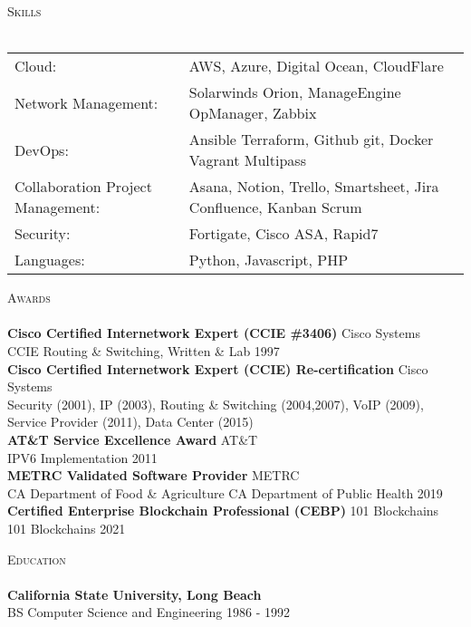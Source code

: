 \documentclass[a4paper]{article}
\newcommand{\lineunder} {
    \vspace*{-8pt} \\
    \hspace*{-18pt} \hrulefill \\
}
\newcommand{\header} [1] {
    {\hspace*{-18pt}\vspace*{6pt} \textsc{#1}}
    \vspace*{-6pt} \lineunder
}
\begin{document}
\header{Skills}
\begin{tabular}{ l l }
	Cloud:                                       & AWS, Azure, Digital Ocean, CloudFlare                                                               \\
	Network Management:                          & Solarwinds Orion, ManageEngine OpManager, Zabbix                                                    \\
	DevOps:                                      & Ansible \textbar{} Terraform, Github \textbar{} git, Docker \textbar{} Vagrant \textbar{} Multipass \\
	Collaboration \textbar{} Project Management: & Asana, Notion, Trello, Smartsheet, Jira \textbar{} Confluence, Kanban \textbar{} Scrum              \\
	Security:                                    & Fortigate, Cisco ASA, Rapid7                                                                        \\
	Languages:                                   & Python, Javascript, PHP                                                                             \\
\end{tabular}
\vspace{2mm}



\header{Awards}
\textbf{Cisco Certified Internetwork Expert (CCIE \#3406)} \hfill Cisco Systems\\
CCIE Routing \& Switching, Written \& Lab \hfill 1997\\
\vspace*{2mm}
\textbf{Cisco Certified Internetwork Expert (CCIE) Re-certification} \hfill Cisco Systems\\
Security (2001), IP (2003), Routing \& Switching (2004,2007), VoIP (2009), Service Provider (2011), Data Center (2015)\\
\vspace*{2mm}
\textbf{AT\&T Service Excellence Award} \hfill AT\&T\\
IPV6 Implementation \hfill 2011\\
\vspace*{2mm}
\textbf{METRC Validated Software Provider} \hfill METRC\\
CA Department of Food \& Agriculture \textbar{} CA Department of Public Health \hfill 2019\\
\vspace*{2mm}
\textbf{Certified Enterprise Blockchain Professional (CEBP)} \hfill 101 Blockchains\\
101 Blockchains \hfill 2021\\
\vspace*{2mm}

\header{Education}
\textbf{California State University, Long Beach}\\
BS Computer Science and Engineering \hfill 1986 - 1992\\
\vspace{2mm}

\ 
\end{document}
